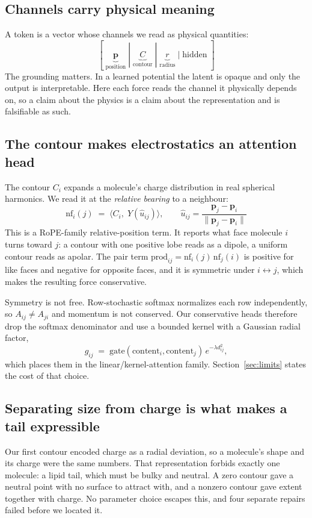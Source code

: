 \documentclass[10pt,twocolumn]{article}
\begin{document}
\subsection{Channels carry physical meaning}

A token is a vector whose channels we read as physical quantities:
\[
[\;\underbrace{\mathbf{p}}_{\text{position}}\;|\;\underbrace{C}_{\text{contour}}\;|\;\underbrace{r}_{\text{radius}}\;|\;\text{hidden}\;]
\]
The grounding matters. In a learned potential the latent is opaque and only the output is
interpretable. Here each force reads the channel it physically depends on, so a claim about the
physics is a claim about the representation and is falsifiable as such.

\subsection{The contour makes electrostatics an attention head}

The contour $C_i$ expands a molecule's charge distribution in real spherical harmonics. We read it at
the \emph{relative bearing} to a neighbour:
\[
\mathrm{nf}_i(j) \;=\; \langle C_i,\; Y(\hat{u}_{ij}) \rangle ,
\qquad \hat{u}_{ij} = \frac{\mathbf{p}_j-\mathbf{p}_i}{\lVert \mathbf{p}_j-\mathbf{p}_i \rVert}
\]
This is a RoPE-family relative-position term. It reports what face molecule $i$ turns toward $j$: a
contour with one positive lobe reads as a dipole, a uniform contour reads as apolar. The pair term
$\mathrm{prod}_{ij} = \mathrm{nf}_i(j)\,\mathrm{nf}_j(i)$ is positive for like faces and negative for
opposite faces, and it is symmetric under $i \leftrightarrow j$, which makes the resulting force
conservative.

Symmetry is not free. Row-stochastic softmax normalizes each row independently, so $A_{ij} \neq
A_{ji}$ and momentum is not conserved. Our conservative heads therefore drop the softmax denominator
and use a bounded kernel with a Gaussian radial factor,
\[
g_{ij} \;=\; \mathrm{gate}\!\left(\text{content}_i,\text{content}_j\right)\,e^{-\lambda d_{ij}^{2}},
\]
which places them in the linear/kernel-attention family. Section~\ref{sec:limits} states the cost of
that choice.

\subsection{Separating size from charge is what makes a tail expressible}
\label{sec:sep}

Our first contour encoded charge as a radial deviation, so a molecule's shape and its charge were the
same numbers. That representation forbids exactly one molecule: a lipid tail, which must be bulky and
neutral. A zero contour gave a neutral point with no surface to attract with, and a nonzero contour
gave extent together with charge. No parameter choice escapes this, and four separate repairs failed
before we located it.
\end{document}
